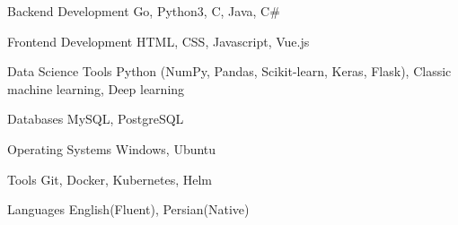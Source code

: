 

\begin{cvskills}

  \cvskill
    {Backend Development} %
    {Go, Python3, C, Java, C\#} %

  \cvskill
    {Frontend Development} %
    {HTML, CSS, Javascript, Vue.js} %

  \cvskill
    {Data Science Tools} %
    {Python (NumPy, Pandas, Scikit-learn, Keras, Flask), Classic machine learning, Deep learning} %

  \cvskill
    {Databases} %
    {MySQL, PostgreSQL} %

  \cvskill
    {Operating Systems} %
    {Windows, Ubuntu} %

  \cvskill
    {Tools} %
    {Git, Docker, Kubernetes, Helm} %
    
  \cvskill
    {Languages} %
    {English(Fluent), Persian(Native)} %

\end{cvskills}
